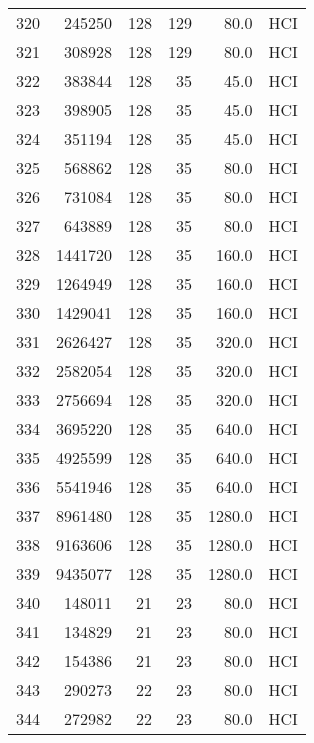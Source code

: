\begin{longtable}{lrrrrl}
320 &    245250 &        128 &       129 &           80.0 &  HCI \\
321 &    308928 &        128 &       129 &           80.0 &  HCI \\
322 &    383844 &        128 &        35 &           45.0 &  HCI \\
323 &    398905 &        128 &        35 &           45.0 &  HCI \\
324 &    351194 &        128 &        35 &           45.0 &  HCI \\
325 &    568862 &        128 &        35 &           80.0 &  HCI \\
326 &    731084 &        128 &        35 &           80.0 &  HCI \\
327 &    643889 &        128 &        35 &           80.0 &  HCI \\
328 &   1441720 &        128 &        35 &          160.0 &  HCI \\
329 &   1264949 &        128 &        35 &          160.0 &  HCI \\
330 &   1429041 &        128 &        35 &          160.0 &  HCI \\
331 &   2626427 &        128 &        35 &          320.0 &  HCI \\
332 &   2582054 &        128 &        35 &          320.0 &  HCI \\
333 &   2756694 &        128 &        35 &          320.0 &  HCI \\
334 &   3695220 &        128 &        35 &          640.0 &  HCI \\
335 &   4925599 &        128 &        35 &          640.0 &  HCI \\
336 &   5541946 &        128 &        35 &          640.0 &  HCI \\
337 &   8961480 &        128 &        35 &         1280.0 &  HCI \\
338 &   9163606 &        128 &        35 &         1280.0 &  HCI \\
339 &   9435077 &        128 &        35 &         1280.0 &  HCI \\
340 &    148011 &         21 &        23 &           80.0 &  HCI \\
341 &    134829 &         21 &        23 &           80.0 &  HCI \\
342 &    154386 &         21 &        23 &           80.0 &  HCI \\
343 &    290273 &         22 &        23 &           80.0 &  HCI \\
344 &    272982 &         22 &        23 &           80.0 &  HCI \\

\end{longtable}
